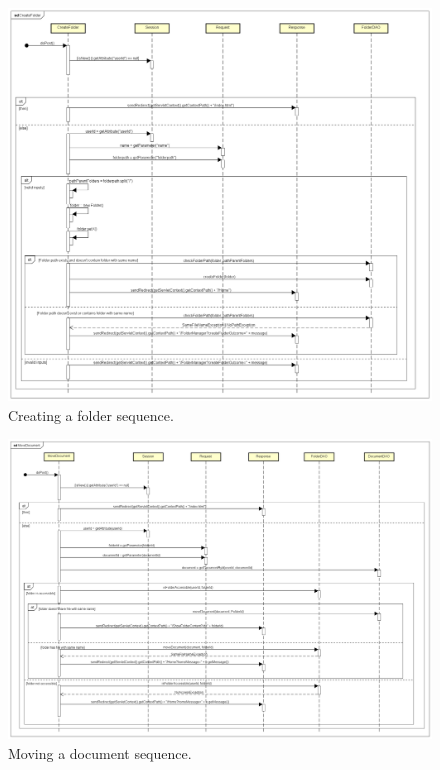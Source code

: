 \documentclass[a4paper,12pt]{article}
\begin{document}
\begin{figure}[H]
    \centering
    \includegraphics[width=1.0\textwidth]{HTML/SequenceDiagram/CreateFolder.png}
    \caption{Creating a folder sequence.}
\end{figure}
    
\begin{figure}[H]
    \centering
    \includegraphics[width=1.0\textwidth]{HTML/SequenceDiagram/MoveDocument.png}
    \caption{Moving a document sequence.}
\end{figure}
    
\end{document}
